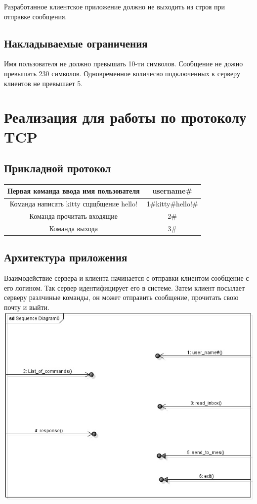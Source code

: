 \documentclass[12pt,a4paper]{report}
\begin{document}
Разработанное клиентское приложение должно не выходить из строя при отправке сообщения.
\section{Накладываемые ограничения}
Имя пользователя не должно превышать 10-ти символов.
Сообщение не дожно превышать 230 символов.
Одновременное количесво подключенных к серверу клиентов не превышает 5.
\chapter{Реализация для работы по протоколу TCP}
\section{Прикладной протокол}

\label{protocol_tcp}
\begin{tabular}{|c|c|}
\hline 
Первая команда ввода имя пользователя & username\# \\ 
\hline 
Команда написать kitty сщщбщение hello! & 1\#kitty\#hello!\# \\ 
\hline 
Команда прочитать входящие & 2\# \\
\hline 
Команда выхода & 3\# \\
\hline 
\end{tabular} 

\section{Архитектура приложения} 
Взаимодействие сервера и клиента начинается с отправки клиентом сообщение с его логином. Так сервер идентифицирует его в системе. Затем клиент посылает серверу разлчиные команды, он может отправить сообщение, прочитать свою почту и выйти.
\linebreak
\center \includegraphics[scale=0.8]{TCP_comm.jpg}
\flushleft
\end{document}

